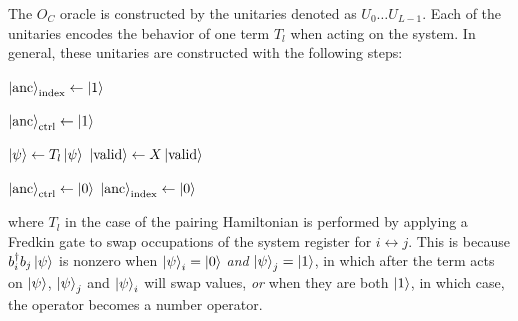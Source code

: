 The $O_C$ oracle is constructed by the unitaries denoted as $U_0 \dots U_{L - 1}$. 
Each of the unitaries encodes the behavior of one term $T_l$ when acting on the system. 
In general, these unitaries are constructed with the following steps:
\begin{algorithmic}[1]
            \State $\ket{\text{anc}}_{\text{index}} \gets \ket{1}$
        \EndIf

            \State $\ket{\text{anc}}_{\text{ctrl}} \gets \ket{1}$
        \EndIf

            \State $\ket{\psi} \gets T_l \ket{\psi}$
            \State $\ket{\text{valid}} \gets X \ket{\text{valid}}$
        \EndIf

        \State $\ket{\text{anc}}_{\text{ctrl}} \gets \ket{0}$
        \State $\ket{\text{anc}}_{\text{index}} \gets \ket{0}$
    \EndFor
\end{algorithmic}
where $T_l$ in the case of the pairing Hamiltonian is performed by applying a Fredkin gate to swap occupations of the system register for $i \leftrightarrow j$.
This is because $b^\dagger_i b_j \ket{\psi}$ is nonzero when $\ket{\psi}_i = \ket{0}$ \textit{and} $\ket{\psi}_j = \ket{1}$, in which after the term acts on $\ket{\psi}$, $\ket{\psi}_j$ and $\ket{\psi}_i$ will swap values, \textit{or} when they are both $\ket{1}$, in which case, the operator becomes a number operator.

